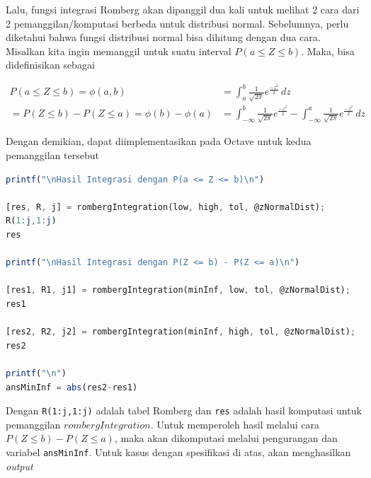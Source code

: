 \documentclass[journal,12pt,onecolumn,a4paper]{IEEEtran}
\begin{document}
Lalu, fungsi integrasi Romberg akan dipanggil dua kali untuk melihat 2 cara dari 2 pemanggilan/komputasi berbeda untuk distribusi normal. Sebelumnya, perlu diketahui bahwa fungsi distribusi normal bisa dihitung dengan dua cara. Misalkan kita ingin memanggil untuk suatu interval \(P(a \le Z \le b)\). Maka, bisa didefinisikan sebagai

\begin{equation*}
	\begin{split}
		P(a \le Z \le b )  = \phi(a,b) & = \int_{a}^{b} \frac{1}{\sqrt{2\pi}}e ^{\frac{-z^2}{2}} \,dz \\
		=  P(Z \le b ) - P(Z \le a )  = \phi(b)-\phi(a) & =  \int_{-\infty}^{b} \frac{1}{\sqrt{2\pi}}e ^{\frac{-z^2}{2}} - \int_{-\infty}^{a} \frac{1}{\sqrt{2\pi}}e ^{\frac{-z^2}{2}} \,dz
	\end{split}
\end{equation*}

Dengan demikian, dapat diimplementasikan pada Octave untuk kedua pemanggilan tersebut

\begin{center}
	\begin{lstlisting}[language=Octave]
printf("\nHasil Integrasi dengan P(a <= Z <= b)\n")

[res, R, j] = rombergIntegration(low, high, tol, @zNormalDist);
R(1:j,1:j)
res

printf("\nHasil Integrasi dengan P(Z <= b) - P(Z <= a)\n")

[res1, R1, j1] = rombergIntegration(minInf, low, tol, @zNormalDist);
res1

[res2, R2, j2] = rombergIntegration(minInf, high, tol, @zNormalDist);
res2

printf("\n")
ansMinInf = abs(res2-res1)
	\end{lstlisting}
\end{center}

Dengan \lstinline{R(1:j,1:j)} adalah tabel Romberg dan \lstinline{res} adalah hasil komputasi untuk pemanggilan \(rombergIntegration\). Untuk memperoleh hasil melalui cara \(P(Z \le b ) - P(Z \le a )\), maka akan dikomputasi melalui pengurangan dan variabel \lstinline{ansMinInf}. Untuk kasus dengan spesifikasi di atas, akan menghasilkan \emph{output}
\end{document}
